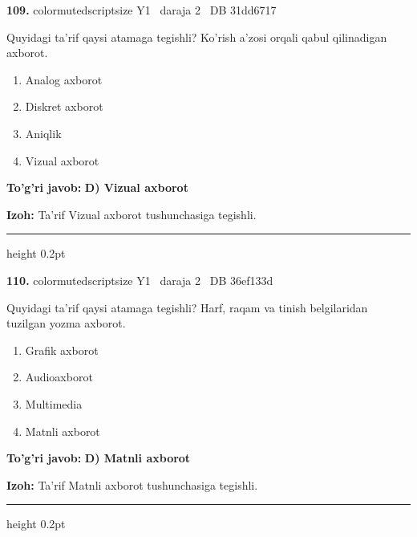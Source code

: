 \documentclass[10pt,a4paper,oneside]{article}
\begin{document}
\noindent\textbf{\color{ink}109.}  {color{muted}scriptsize Y1 \textbullet\ daraja 2 \textbullet\ DB 31dd6717}
\par
Quyidagi ta'rif qaysi atamaga tegishli? Ko'rish a'zosi orqali qabul qilinadigan axborot.
\begin{enumerate}[label=\Alph*),leftmargin=9mm]
\item Analog axborot
\item Diskret axborot
\item Aniqlik
\item Vizual axborot
\end{enumerate}
\begin{tcolorbox}[enhanced,breakable,colback=teal!4,colframe=teal!50!black,boxrule=0.5pt,arc=1.1mm,left=3mm,right=3mm,top=1.7mm,bottom=1.7mm,before skip=2mm,after skip=2mm]
\textbf{\color{teal}To'g'ri javob:} \textbf{D) Vizual axborot}
\par\smallskip
\textbf{Izoh:} Ta'rif Vizual axborot tushunchasiga tegishli.
\end{tcolorbox}
\vspace{2mm}\hrule height 0.2pt \vspace{3mm}

\noindent\textbf{\color{ink}110.}  {color{muted}scriptsize Y1 \textbullet\ daraja 2 \textbullet\ DB 36ef133d}
\par
Quyidagi ta'rif qaysi atamaga tegishli? Harf, raqam va tinish belgilaridan tuzilgan yozma axborot.
\begin{enumerate}[label=\Alph*),leftmargin=9mm]
\item Grafik axborot
\item Audioaxborot
\item Multimedia
\item Matnli axborot
\end{enumerate}
\begin{tcolorbox}[enhanced,breakable,colback=teal!4,colframe=teal!50!black,boxrule=0.5pt,arc=1.1mm,left=3mm,right=3mm,top=1.7mm,bottom=1.7mm,before skip=2mm,after skip=2mm]
\textbf{\color{teal}To'g'ri javob:} \textbf{D) Matnli axborot}
\par\smallskip
\textbf{Izoh:} Ta'rif Matnli axborot tushunchasiga tegishli.
\end{tcolorbox}
\vspace{2mm}\hrule height 0.2pt \vspace{3mm}
\end{document}
